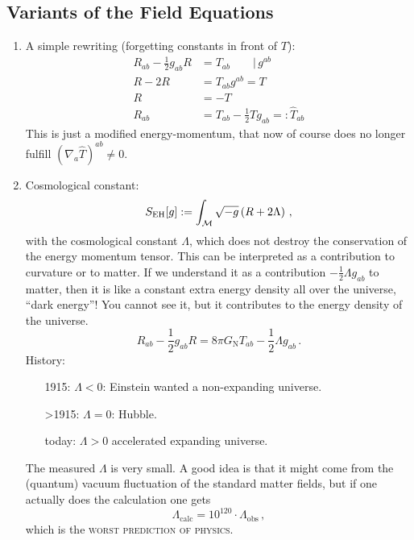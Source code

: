 \subsection{Variants of the Field Equations}
\begin{enumerate}[label=(\alph*)]
    \item A simple rewriting (forgetting constants in front of $T$):
        \begin{align*}
            R_{ab} - \frac{1}{2} g_{ab} R &= T_{ab} \quad\quad \Big|\, g^{ab} \\
            R - 2R &= T_{ab}g^{ab} = T \\
            R &= -T \\
            R_{ab} &= T_{ab} - \frac{1}{2}T g_{ab} =: \hat{T}_{ab}
        \end{align*}
        This is just a modified energy-momentum, that now of course
        does no longer fulfill $(\nabla_a \hat{T})^{ab} \neq 0$.
    \item Cosmological constant:
        \begin{equation}
            S_\text{EH}[g] := \int_{\mathcal{M}} \sqrt{-g} \left( R + 2 \Lambda \right) \,,
        \end{equation}
        with the cosmological constant $\Lambda$, which does not destroy
        the conservation of the energy momentum tensor.
        This can be interpreted as a contribution to curvature or to matter.
        If we understand it as a contribution $-\frac{1}{2}\Lambda g_{ab}$ to matter,
        then it is like a constant extra energy density all over the universe,
        ``dark energy''!
        You cannot see it, but it contributes to the energy density of the universe.
        \begin{equation}
            R_{ab} - \frac{1}{2} g_{ab} R = 8\pi G_\text{N}T_{ab} - \frac{1}{2} \Lambda g_{ab}\,.
        \end{equation}
        History:
        \begin{itemize}
            \item[1915:] $\Lambda <0$: Einstein wanted a non-expanding universe.
            \item[>1915:] $\Lambda = 0$: Hubble.
            \item[today:] $\Lambda > 0$ accelerated expanding universe.
        \end{itemize}
        The measured $\Lambda$ is very small.
        A good idea is that it might come from the (quantum) vacuum fluctuation of the
        standard matter fields, but if one actually does the calculation one gets
        \begin{equation}
            \Lambda_\text{calc} = 10^{120} \cdot \Lambda_\text{obs}\,,
        \end{equation}
        which is the \textsc{worst prediction of physics}.
        
\end{enumerate}
